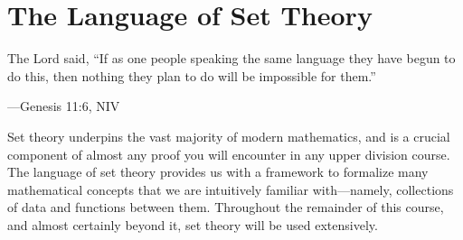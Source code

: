 \documentclass[../notes.tex]{subfiles}
\begin{document}
\chapter{The Language of Set Theory} \label{ch:set}
\epigraph{The Lord said, ``If as one people speaking the same language they have begun to do this, then nothing they plan to do will be impossible for them.''}
{---Genesis 11:6, NIV}

Set theory underpins the vast majority of modern mathematics, and is a crucial component of almost any proof you will encounter in any upper division course. The language of set theory provides us with a framework to formalize many mathematical concepts that we are intuitively familiar with---namely, collections of data and functions between them. Throughout the remainder of this course, and almost certainly beyond it, set theory will be used extensively.



% 
\end{document}
